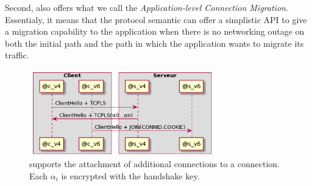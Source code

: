 Second, \tcpls also offers what we call the \textit{Application-level Connection
  Migration}. Essentialy, it means that the \tcpls protocol semantic can offer a
simplistic API to give a migration capability to the application when there is no
networking outage on both the initial path and the path in which the application
wants to migrate its traffic.



\begin{figure}[!t]
  \begin{center}
    \includegraphics[width=8cm]{figures/join-example.png}
  \end{center}
  \caption{\tcpls supports the attachment of additional \tcp
    connections to a \tcpls connection. Each $\alpha_i$ is encrypted with the
    handshake key.}
  \label{fig:join-example}
   \vspace{-0.5cm}
\end{figure}


